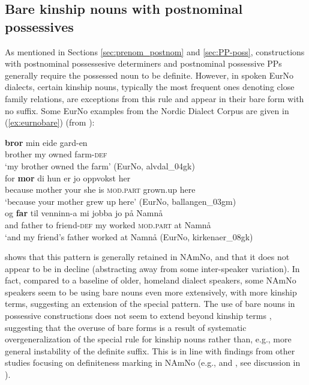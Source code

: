 \documentclass[output=paper,colorlinks,citecolor=brown]{langscibook}
\begin{document}
\subsection{Bare kinship nouns with postnominal possessives}\label{subsec:bare}
As mentioned in Sections \ref{sec:prenom_postnom} and \ref{sec:PP-poss},  constructions with postnominal possessesive determiners and postnominal possessive PPs generally require the possessed noun to be definite. However, in spoken EurNo dialects, certain kinship nouns, typically the most frequent ones denoting close family relations, are exceptions from this rule and appear in their bare form with no suffix. Some EurNo examples from the Nordic Dialect Corpus are given in (\ref{ex:eurnobare}) (from \citealt{kinn2021split}):

\ea \label{ex:eurnobare}
\ea \gll \textbf{bror} min eide gard-en\\
brother my owned farm-\textsc{def}\\
\glt `my brother owned the farm' (EurNo, alvdal\_04gk) \\
\ex \gll for \textbf{mor} di hun er jo oppvokst her\\
because mother your she is \textsc{mod.part} grown.up here\\
\glt `because your mother grew up here' (EurNo, ballangen\_03gm)\\
\ex \gll og \textbf{far} til venninn-a mi jobba jo på Namnå\\
and father to friend-\textsc{def} my worked \textsc{mod.part} at Namnå\\
\glt `and my friend's father worked at Namnå (EurNo, kirkenaer\_08gk)
\z
\z



\noindent \citet{kinn2021split} shows that this pattern is generally retained in NAmNo, and that it does not appear to be in decline (abstracting away from some inter-speaker variation). In fact, compared to a baseline of older, homeland dialect speakers, some NAmNo speakers seem to be using bare nouns even more extensively, with more kinship terms, suggesting an extension of the  special pattern. The use of bare nouns in possessive constructions does not seem to extend beyond kinship terms \citep[203]{kinn2021split}, suggesting that the overuse of bare forms is a result of systematic overgeneralization of the special rule for kinship nouns rather than, e.g., more general instability of the definite suffix. This is in line with findings from other studies focusing on definiteness marking in NAmNo (e.g., \citealt{anderssenetal2018cross-linguistic} and \citealt{vanbaal2020comp}, see discussion in ).  
\end{document}
